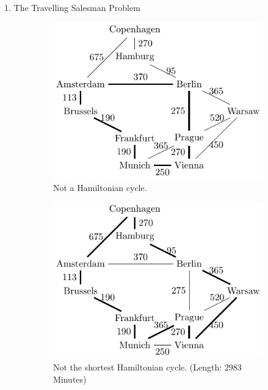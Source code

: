 \documentclass[]{templates/poster}
\begin{document}
\begin{frame}{}
\begin{columns}[t]
\begin{column}{0.422\linewidth}
\begin{block}{\Large 1. The Travelling Salesman Problem}
  \begin{center}
  \begin{figure}
  \begin{subfigure}[t]{0.3\linewidth}
  \includegraphics[width=\linewidth]{not_hamiltonian}
  \caption{ Not a Hamiltonian cycle.}
  \end{subfigure}
  \begin{subfigure}[t]{0.3\linewidth}
  \includegraphics[width=\linewidth]{not_shortest}
  \caption{ Not the shortest Hamiltonian cycle. (Length: $2983$ Minutes)}
  \end{subfigure}
  \begin{subfigure}[t]{0.3\linewidth}

\end{subfigure}
\end{figure}
\end{center}
\end{block}
\end{column}
\end{columns}
\end{frame}
\end{document}
